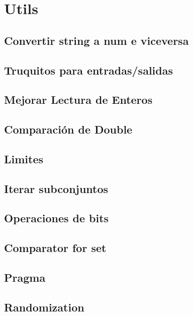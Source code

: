 \newpage
\section{Utils}
\subsection{Convertir string a num e viceversa}

\subsection{Truquitos para entradas/salidas}

\subsection{Mejorar Lectura de Enteros}

\subsection{Comparaci\'on de Double}

\subsection{Limites}

\subsection{Iterar subconjuntos}

\subsection{Operaciones de bits}

\subsection{Comparator for set}

\subsection{Pragma}

\subsection{Randomization}

